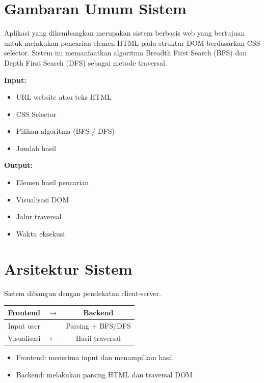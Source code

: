 \section{Gambaran Umum Sistem}

Aplikasi yang dikembangkan merupakan sistem berbasis web yang bertujuan untuk melakukan pencarian elemen HTML pada struktur DOM berdasarkan CSS selector. Sistem ini memanfaatkan algoritma Breadth First Search (BFS) dan Depth First Search (DFS) sebagai metode traversal.

\begin{tcolorbox}[colback=gray!10,title=Input dan Output Sistem]
\textbf{Input:}
\begin{itemize}
    \item URL website atau teks HTML
    \item CSS Selector
    \item Pilihan algoritma (BFS / DFS)
    \item Jumlah hasil
\end{itemize}

\textbf{Output:}
\begin{itemize}
    \item Elemen hasil pencarian
    \item Visualisasi DOM
    \item Jalur traversal
    \item Waktu eksekusi
\end{itemize}
\end{tcolorbox}

\section{Arsitektur Sistem}

Sistem dibangun dengan pendekatan client-server.

\begin{center}
\begin{tabular}{|c|c|c|}
\hline
Frontend & $\rightarrow$ & Backend \\
\hline
Input user & & Parsing + BFS/DFS \\
\hline
Visualisasi & $\leftarrow$ & Hasil traversal \\
\hline
\end{tabular}
\end{center}

\begin{itemize}
    \item Frontend: menerima input dan menampilkan hasil
    \item Backend: melakukan parsing HTML dan traversal DOM
\end{itemize}


